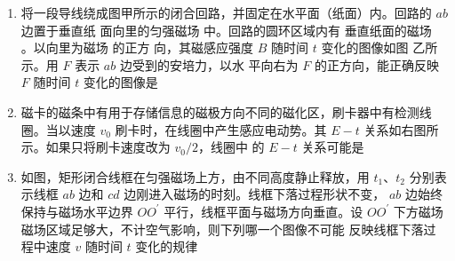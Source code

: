 \begin{enumerate}
\pfourchoices
{}
{}
{}
{}



\item 
{}
将一段导线绕成图甲所示的闭合回路，并固定在水平面（纸面）内。回路的 $ ab $ 边置于垂直纸
面向里的匀强磁场  中。回路的圆环区域内有
垂直纸面的磁场  。以向里为磁场  的正方
向，其磁感应强度 $ B $ 随时间 $ t $ 变化的图像如图
乙所示。用 $ F $ 表示 $ ab $ 边受到的安培力，以水
平向右为 $ F $ 的正方向，能正确反映 $ F $ 随时间 $ t $
变化的图像是  
\begin{figure}[h!]
\centering
\begin{subfigure}{0.4\linewidth}
\centering
 
\caption{}\label{}
\end{subfigure}
\begin{subfigure}{0.4\linewidth}
\centering
 
\caption{}\label{}
\end{subfigure}
\end{figure}


\pfourchoices
{}
{}
{}
{}


\item 
{}
磁卡的磁条中有用于存储信息的磁极方向不同的磁化区，刷卡器中有检测线圈。当以速度 $ v_{0} $
刷卡时，在线圈中产生感应电动势。其 $ E-t $ 关系如右图所示。如果只将刷卡速度改为 $ v_{0}/2 $，线圈中
的 $ E-t $ 关系可能是  
\begin{figure}[h!]
\centering

\end{figure}

\pfourchoices
{}
{}
{}
{}



\item
{}
如图，矩形闭合线框在匀强磁场上方，由不同高度静止释放，用 $ t_{1} $、$ t_{2} $
分别表示线框 $ ab $ 边和 $ cd $ 边刚进入磁场的时刻。线框下落过程形状不变，
$ ab $ 边始终保持与磁场水平边界 $ OO ^{\prime} $ 平行，线框平面与磁场方向垂直。设
$ OO ^{\prime} $ 下方磁场磁场区域足够大，不计空气影响，则下列哪一个图像不可能
反映线框下落过程中速度 $ v $ 随时间 $ t $ 变化的规律  
\begin{figure}[h!]
\centering

\end{figure}


\end{enumerate}
